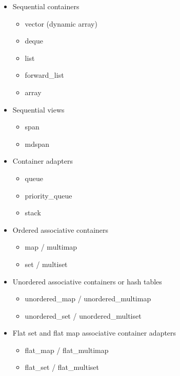 \begin{itemize}
\item
Sequential containers
\begin{itemize}
\item
vector (dynamic array)

\item
deque

\item
list

\item
forward\_list

\item
array
\end{itemize}

\item
Sequential views
\begin{itemize}
\item
span

\item
mdspan
\end{itemize}

\item
Container adapters
\begin{itemize}
\item
queue

\item
priority\_queue

\item
stack
\end{itemize}

\item
Ordered associative containers
\begin{itemize}
\item
map / multimap

\item
set / multiset
\end{itemize}

\item
Unordered associative containers or hash tables
\begin{itemize}
\item
unordered\_map / unordered\_multimap

\item
unordered\_set / unordered\_multiset
\end{itemize}

\item
Flat set and flat map associative container adapters
\begin{itemize}
\item
flat\_map / flat\_multimap

\item
flat\_set / flat\_multiset
\end{itemize}
\end{itemize}

